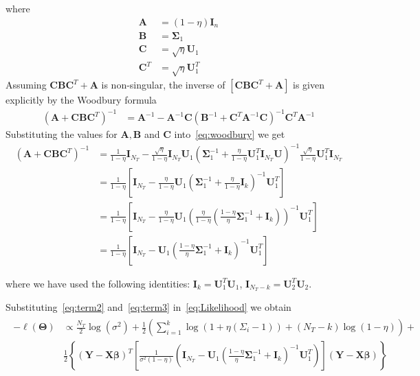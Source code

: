 \documentclass[12pt,letter]{article}\usepackage[]{graphicx}\usepackage[]{color}
\newcommand{\bA}{\mb{A}}
\newcommand{\bB}{\mb{B}}
\newcommand{\bC}{\mb{C}}
\newcommand{\bX}{\textbf{X}}
\newcommand{\bY}{\textbf{Y}}
\newcommand{\bU}{\textbf{U}}
\newcommand{\bI}{\textbf{I}}
\newcommand{\bSigma}{\boldsymbol{\Sigma}}
\newcommand{\bTheta}{\boldsymbol{\Theta}}
\newcommand{\mb}[1]{\mathbf{#1}}
\newcommand{\bbeta}{\boldsymbol{\beta}}
\begin{document}
where
\begin{align*}
	\mb{A} & = (1-\eta) \bI_n \\
	\mb{B} & = \bSigma_1 \\
	\mb{C} & = \sqrt{\eta} \bU_1 \\
	\mb{C}^T & = \sqrt{\eta} \bU_1^T
\end{align*}
Assuming $\bC \bB \bC^T + \mb{A}$ is non-singular, the inverse of $\left[ \bC \bB \bC^T + \mb{A} \right]$ is given explicitly by the Woodbury formula~\citep{golub2012matrix}
\begin{align}
	\left(\bA + \bC \bB \bC^T\right)^{-1} & = \bA^{-1} - \bA^{-1} \bC \left(\bB^{-1} + \bC^T\bA^{-1} \bC\right)^{-1}\bC^T \bA^{-1} \label{eq:woodbury}
\end{align}
Substituting the values for $\bA, \bB$ and $\bC$ into~\eqref{eq:woodbury} we get
\begin{align}
	\left(\bA + \bC \bB \bC^T\right)^{-1} & = \frac{1}{1-\eta}\bI_{N_T} - \frac{\sqrt{\eta}}{1-\eta}\bI_{N_T}\bU_1 \left(\bSigma_1^{-1} + \frac{\eta}{1-\eta}\bU_1^T \bI_{N_T} \bU\right)^{-1}\frac{\sqrt{\eta}}{1-\eta}\bU_1^T \bI_{N_T} \nonumber \\
	& = \frac{1}{1-\eta} \left[ \bI_{N_T} - \frac{\eta}{1-\eta}\bU_1 \left(\bSigma_1^{-1} + \frac{\eta}{1-\eta}\bI_{k} \right)^{-1}\bU_1^T \right] \nonumber \\
	& = \frac{1}{1-\eta} \left[ \bI_{N_T} - \frac{\eta}{1-\eta}\bU_1 \left(\frac{\eta}{1-\eta} \left(\frac{1-\eta}{\eta}\bSigma_1^{-1} + \bI_{k}\right) \right)^{-1}\bU_1^T \right] \nonumber \\
	& = \frac{1}{1-\eta} \left[ \bI_{N_T} - \bU_1 \left(\frac{1-\eta}{\eta}\bSigma_1^{-1} + \bI_{k}\right) ^{-1}\bU_1^T \right] \label{eq:term3}
\end{align}


where we have used the following identities: $\bI_k = \bU_1^T\bU_1$, $\bI_{N_T -k} = \bU_2^T\bU_2$.

Substituting~\eqref{eq:term2} and~\eqref{eq:term3} in~\eqref{eq:Likelihood} we obtain
\begin{align}
	\begin{split}
		-\ell(\bTheta) & \propto \frac{N_T}{2}\log(\sigma^2) + \frac{1}{2} \left(  \sum_{i=1}^{k} \log(1 + \eta (\Sigma_i-1)) + (N_T-k) \log(1-\eta)\right) + \\
		&\frac{1}{2} \left\lbrace \left(\bY - \bX\bbeta \right)^T  \left[\frac{1}{\sigma^2(1-\eta)}\left(  \bI_{N_T} - \bU_1 \left(\frac{1-\eta}{\eta}\bSigma_1^{-1} + \bI_{k}\right) ^{-1}\bU_1^T \right)  \right] \left(\bY - \bX\bbeta \right)  \right\rbrace
	\end{split} \label{eq:loglikrowrank}
\end{align}
\end{document}

